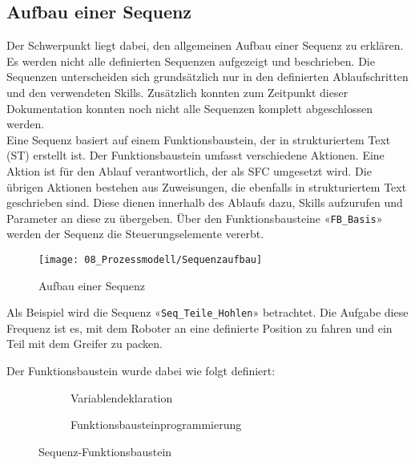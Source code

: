 	\subsection{Aufbau einer Sequenz} \label{Prozessmodell_Sequenzaufbau}
		Der Schwerpunkt liegt dabei, den allgemeinen Aufbau einer Sequenz zu erklären. Es werden nicht alle definierten Sequenzen aufgezeigt und beschrieben. Die Sequenzen unterscheiden sich grundsätzlich nur in den definierten Ablaufschritten und den verwendeten Skills. Zusätzlich konnten zum Zeitpunkt dieser Dokumentation konnten noch nicht alle Sequenzen komplett abgeschlossen werden. 
		\\
		Eine Sequenz basiert auf einem Funktionsbaustein, der in strukturiertem Text (\Gls{ST}) erstellt ist. Der Funktionsbaustein umfasst verschiedene Aktionen. Eine Aktion ist für den Ablauf verantwortlich, der als \Gls{SFC} umgesetzt wird. Die übrigen Aktionen bestehen aus Zuweisungen, die ebenfalls in strukturiertem Text geschrieben sind. Diese dienen innerhalb des Ablaufs dazu, Skills aufzurufen und Parameter an diese zu übergeben. Über den Funktionsbausteine «\verb|FB_Basis|» werden der Sequenz die Steuerungselemente vererbt. 
		\\
		\begin{figure}[H]
			\centering
			\texttt{[image: 08\_Prozessmodell/Sequenzaufbau]}
			\captionsetup{justification=centering}
			\caption{Aufbau einer Sequenz}
			\label{fig:Sequenzaufbau}
		\end{figure}
		
		Als Beispiel wird die Sequenz «\verb|Seq_Teile_Hohlen|» betrachtet. Die Aufgabe diese Frequenz ist es, mit dem Roboter an eine definierte Position zu fahren und ein Teil mit dem Greifer zu packen. 
		
		\newpage
		
		Der Funktionsbaustein wurde dabei wie folgt  definiert: 
		
		\begin{figure}[h!]
			\centering
			\begin{subfigure}[b]{0.58\textwidth}
				\centering
				\caption{Variablendeklaration}
				\label{fig:Sequent_Variablendeklaration}
			\end{subfigure}
			\hfill
			\begin{subfigure}[b]{0.30\textwidth}
				\centering
				\caption{Funktionsbausteinprogrammierung}
				\label{fig:Sequenz_Funktionsbausteinprogrammierung}
			\end{subfigure}
			\caption{Sequenz-Funktionsbaustein}
			\label{fig:SequenzFunktionsbaustein}
		\end{figure} 
		
